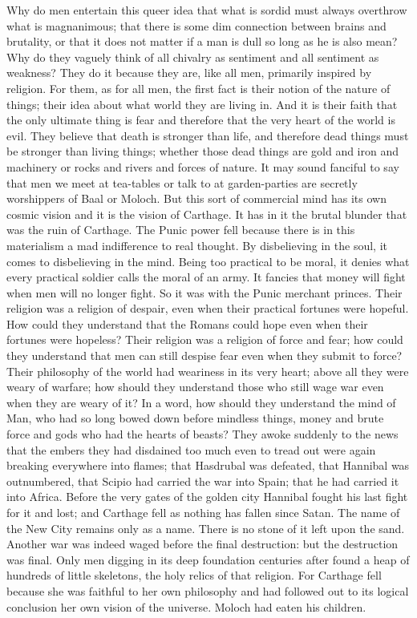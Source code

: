 Why do men entertain this queer idea that what is sordid must always overthrow what is magnanimous; that there is some dim connection between brains and brutality, or that it does not matter if a man is dull so long as he is also mean? Why do they vaguely think of all chivalry as sentiment and all sentiment as weakness? They do it because they are, like all men, primarily inspired by religion. For them, as for all men, the first fact is their notion of the nature of things; their idea about what world they are living in. And it is their faith that the only ultimate thing is fear and therefore that the very heart of the world is evil. They believe that death is stronger than life, and therefore dead things must be stronger than living things; whether those dead things are gold and iron and machinery or rocks and rivers and forces of nature. It may sound fanciful to say that men we meet at tea-tables or talk to at garden-parties are secretly worshippers of Baal or Moloch. But this sort of commercial mind has its own cosmic vision and it is the vision of Carthage. It has in it the brutal blunder that was the ruin of Carthage. The Punic power fell because there is in this materialism a mad indifference to real thought. By disbelieving in the soul, it comes to disbelieving in the mind. Being too practical to be moral, it denies what every practical soldier calls the moral of an army. It fancies that money will fight when men will no longer fight. So it was with the Punic merchant princes. Their religion was a religion of despair, even when their practical fortunes were hopeful. How could they understand that the Romans could hope even when their fortunes were hopeless? Their religion was a religion of force and fear; how could they understand that men can still despise fear even when they submit to force? Their philosophy of the world had weariness in its very heart; above all they were weary of warfare; how should they understand those who still wage war even when they are weary of it? In a word, how should they understand the mind of Man, who had so long bowed down before mindless things, money and brute force and gods who had the hearts of beasts? They awoke suddenly to the news that the embers they had disdained too much even to tread out were again breaking everywhere into flames; that Hasdrubal was defeated, that Hannibal was outnumbered, that Scipio had carried the war into Spain; that he had carried it into Africa. Before the very gates of the golden city Hannibal fought his last fight for it and lost; and Carthage fell as nothing has fallen since Satan. The name of the New City remains only as a name. There is no stone of it left upon the sand. Another war was indeed waged before the final destruction: but the destruction was final. Only men digging in its deep foundation centuries after found a heap of hundreds of little skeletons, the holy relics of that religion. For Carthage fell because she was faithful to her own philosophy and had followed out to its logical conclusion her own vision of the universe. Moloch had eaten his children.

